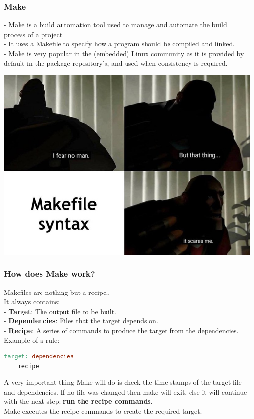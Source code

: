 \documentclass{beamer}
\begin{document}
\begin{frame}[fragile]
\frametitle{Make}
\begin{multicols}{2}[]
    \footnotesize
    - Make is a build automation tool used to manage and automate the build process of a project.\\
    - It uses a Makefile to specify how a program should be compiled and linked.\\
    - Make is very popular in the (embedded) Linux community as it is provided by default in the package repository's, and used when consistency is required.
    
\includegraphics[width=\linewidth]{figures/makefile_syntax.jpg}
\end{multicols}
\end{frame}

\begin{frame}[fragile]
\frametitle{How does Make work?}
Makefiles are nothing but a recipe.. \\
It always contains: \\
- \textbf{Target}:  The output file to be built. \\
- \textbf{Dependencies}: Files that the target depends on.\\
- \textbf{Recipe}: A series of commands to produce the target from the dependencies.\\
Example of a rule: \\
\begin{lstlisting}[language=make]
    target: dependencies
    recipe
\end{lstlisting}
A very important thing Make will do is check the time stamps of the target file and dependencies. If no file was changed then make will exit, else it will continue with the next step: \textbf{run the recipe commands}. \\
Make executes the recipe commands to create the required target.
\end{frame}
\end{document}

